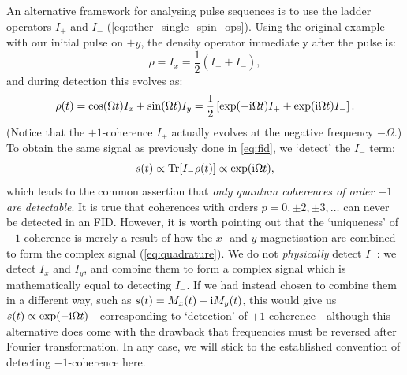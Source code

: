 An alternative framework for analysing pulse sequences is to use the ladder operators $I_+$ and $I_-$ (\cref{eq:other_single_spin_ops}).
Using the original example with our initial pulse on $+y$, the density operator immediately after the pulse is:
\begin{equation}
    \label{eq:rho_coherences}
    \rho = I_x = \frac{1}{2}(I_+ + I_-),
\end{equation}
and during detection this evolves as:
\begin{equation}
    \label{eq:fid_coherences}
    \rho(t) = \cos(\Omega t)I_x + \sin(\Omega t)I_y = \frac{1}{2}\left[\exp(-\mathrm{i} \Omega t)I_+ + \exp(\mathrm{i} \Omega t)I_- \right].
\end{equation}
(Notice that the $+1$-coherence $I_+$ actually evolves at the negative frequency $-\Omega$.)
To obtain the same signal as previously done in \cref{eq:fid}, we `detect' the $I_-$ term:
\begin{equation}
    \label{eq:detection_coherences}
    s(t) \propto \operatorname{Tr}[I_- \rho(t)] \propto \exp(\mathrm{i}\Omega t),
\end{equation}
which leads to the common assertion that \textit{only quantum coherences of order $-1$ are detectable}.
It is true that coherences with orders $p = 0, \pm 2, \pm 3, \ldots$ can never be detected in an FID.
However, it is worth pointing out that the `uniqueness' of $-1$-coherence is merely a result of how the $x$- and $y$-magnetisation are combined to form the complex signal (\cref{eq:quadrature}).
We do not \textit{physically} detect $I_-$: we detect $I_x$ and $I_y$, and combine them to form a complex signal which is mathematically equal to detecting $I_-$.
If we had instead chosen to combine them in a different way, such as $s(t) = M_x(t) - \mathrm{i} M_y(t)$, this would give us $s(t) \propto \exp(-\mathrm{i}\Omega t)$---corresponding to `detection' of $+1$-coherence---although this alternative does come with the drawback that frequencies must be reversed after Fourier transformation.
In any case, we will stick to the established convention of detecting $-1$-coherence here.

